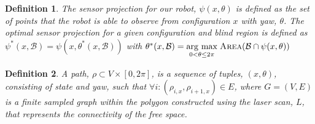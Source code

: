 \documentclass[letterpaper, 10pt, conference]{ieeeconf}
\newcommand{\Area}[0]{\ensuremath{{\textsc{Area}}}}
\newcommand{\B}[0]{\ensuremath{{{\mathcal{B}}}}}
\newcommand{\argmax}[1]{\underset{#1}{\operatorname{arg}\,\operatorname{max}}\;}
\newtheorem{definition}{Definition}
\begin{document}
\begin{definition}

    The sensor projection for our robot, $\psi(x, \theta)$ is defined as the
    set of points that the robot is able to observe from configuration $x$ with
    yaw, $\theta$. The optimal sensor projection for a given configuration and
    blind region is defined as $\psi^*(x, \B) = \psi(x, \theta^*(x, \B))$ with
    $\theta^*(x, \B) = \argmax{0 < \theta \leq 2\pi} \Area(\B \cap \psi(x,
    \theta))$

\end{definition}

\begin{definition}

    A path, $\rho \subset V \times [0, 2 \pi]$, is a sequence of tuples, $(x,
    \theta)$, consisting of state and yaw, such that $\forall
    i : (\rho_{i, x}, \rho_{i + 1, x}) \in E$, where $G = (V, E)$ is a finite
    sampled graph within the polygon constructed using the laser scan, $L$,
    that represents the connectivity of the free space.

\end{definition}
\end{document}
